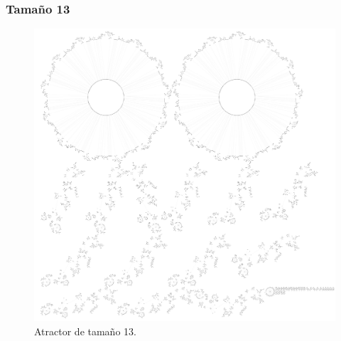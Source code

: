 \documentclass[11pt]{article}
\begin{document}
			\subsubsection{Tamaño 13}
			\begin{figure}[H]
			\centering
			\includegraphics[scale=0.15]{resources/Atractores54/atractor_54_size_13.png}
			\caption{Atractor de tamaño 13.}\label{fig:picture}
			\end{figure}
\end{document}

